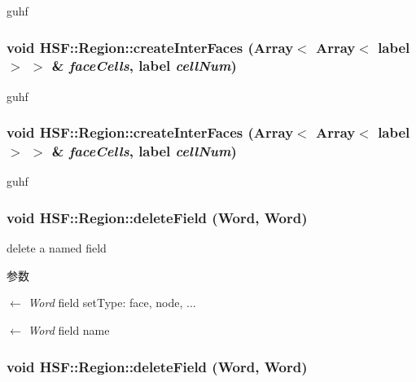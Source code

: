 guhf \hypertarget{classHSF_1_1Region_a39c7b59ebdc736618d652d53d1dace0b}{
\subsubsection[{createInterFaces}]{\setlength{\rightskip}{0pt plus 5cm}void HSF::Region::createInterFaces (Array$<$ Array$<$ label $>$ $>$ \& {\em faceCells}, \/  label {\em cellNum})}}
\label{classHSF_1_1Region_a39c7b59ebdc736618d652d53d1dace0b}


guhf \hypertarget{classHSF_1_1Region_a39c7b59ebdc736618d652d53d1dace0b}{
\subsubsection[{createInterFaces}]{\setlength{\rightskip}{0pt plus 5cm}void HSF::Region::createInterFaces (Array$<$ Array$<$ label $>$ $>$ \& {\em faceCells}, \/  label {\em cellNum})}}
\label{classHSF_1_1Region_a39c7b59ebdc736618d652d53d1dace0b}


guhf \hypertarget{classHSF_1_1Region_ab74797105c6eaf54c3d5101a919d15b6}{
\subsubsection[{deleteField}]{\setlength{\rightskip}{0pt plus 5cm}void HSF::Region::deleteField (Word, \/  Word)}}
\label{classHSF_1_1Region_ab74797105c6eaf54c3d5101a919d15b6}


delete a named field 
\begin{DoxyParams}{参数}
\item[\mbox{$\leftarrow$} {\em Word}]field setType: face, node, ... \item[\mbox{$\leftarrow$} {\em Word}]field name \end{DoxyParams}
\hypertarget{classHSF_1_1Region_ab74797105c6eaf54c3d5101a919d15b6}{
\subsubsection[{deleteField}]{\setlength{\rightskip}{0pt plus 5cm}void HSF::Region::deleteField (Word, \/  Word)}}
\label{classHSF_1_1Region_ab74797105c6eaf54c3d5101a919d15b6}


